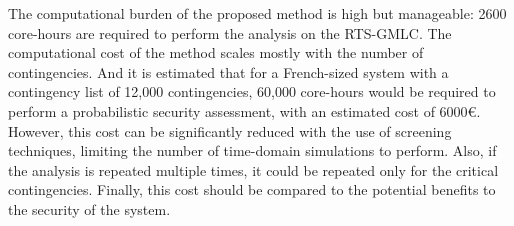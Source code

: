 The computational burden of the proposed method is high but manageable: 2600 core-hours are required to perform the analysis on the RTS-GMLC. The computational cost of the method scales mostly with the number of contingencies. And it is estimated that for a French-sized system with a contingency list of 12,000 contingencies, 60,000 core-hours would be required to perform a probabilistic security assessment, with an estimated cost of 6000€. However, this cost can be significantly reduced with the use of screening techniques, limiting the number of time-domain simulations to perform. Also, if the analysis is repeated multiple times, it could be repeated only for the critical contingencies. Finally, this cost should be compared to the potential benefits to the security of the system.
